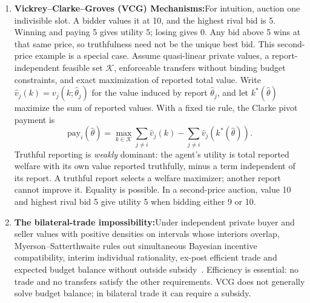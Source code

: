 \begin{enumerate}[leftmargin=1.8em,itemsep=3pt]
  \item \textbf{Vickrey--Clarke--Groves (VCG) Mechanisms:}\enspace For intuition, auction one indivisible slot. A bidder values it at 10,
and the highest rival bid is 5. Winning and paying 5 gives utility 5; losing
gives 0. Any bid above 5 wins at that same price, so truthfulness need not be
the unique best bid. This second-price example is a special case.
Assume quasi-linear private values, a report-independent feasible set $\mathcal K$, enforceable transfers without binding budget constraints, and exact maximization of reported total value. Write $\hat v_j(k)=v_j(k;\hat\theta_j)$ for the value induced by report
$\hat\theta_j$, and let $k^*(\hat\theta)$ maximize the sum of reported values.
With a fixed tie rule, the Clarke pivot payment is~
  \begin{equation}
  \mathrm{pay}_i(\hat\theta)=\max_{k\in\mathcal K}\sum_{j\ne i}\hat v_j(k)
  -\sum_{j\ne i}\hat v_j(k^*(\hat\theta)).
  \end{equation}
  Truthful reporting is \emph{weakly} dominant: the agent's utility is total reported welfare with its own value reported truthfully, minus a term independent of its report. A truthful report selects a welfare maximizer; another report cannot improve it. Equality is possible. In a second-price auction, value 10 and highest rival bid 5 give utility 5 when bidding either 9 or 10.

  \item \textbf{The bilateral-trade impossibility:}\enspace Under independent private buyer and seller values with positive densities on intervals whose interiors overlap, Myerson--Satterthwaite rules out simultaneous Bayesian incentive compatibility, interim individual rationality, ex-post efficient trade and expected budget balance without outside subsidy~. Efficiency is essential: no trade and no transfers satisfy the other requirements. VCG does not generally solve budget balance; in bilateral trade it can require a subsidy.

\end{enumerate}

